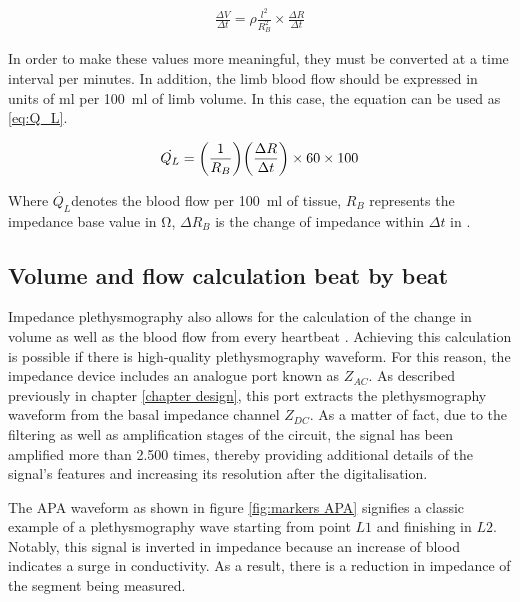 \begin{align}
	\label{eq:DVDT}
	\frac{\Delta V}{\Delta t}= \rho \frac{l^2}{R_B^2} \times \frac{\Delta R}{\Delta t}
\end{align} 

In order to make these values more meaningful, they must be converted at a time interval per minutes. In addition, the limb blood flow should be expressed in units of \si{\milli\litre} per \SI{100}{\milli\litre} of limb volume. In this case, the equation can be used as \ref{eq:Q_L}.

\begin{align}
	\label{eq:Q_L}
	\dot{Q_L} = \bigg( \frac{1}{R_B} \bigg) \bigg( \frac{\Delta R}{\Delta t} \bigg) \times 60  \times 100  \tagaddtext{[\si{ml/min.100.ml}]}
\end{align} 

Where $\dot{Q_L}$denotes the blood flow per \SI{100}{\milli\litre} of tissue, $R_B$ represents the impedance base value in \si{\ohm}, $\Delta R_B$ is the change of impedance within ${\Delta t}$ in \si{\sec}.

\subsection{Volume and flow calculation beat by beat}
\label{section procedure flow beat}
Impedance plethysmography also allows for the calculation of the change in volume as well as the blood flow from every heartbeat \cite{costeloe1980continuous, anderson1984impedance, mohapatra1981non, golden1986assessment}. Achieving this calculation is possible if there is high-quality plethysmography waveform. For this reason, the impedance device includes an analogue port known as $Z_{AC}$. As described previously in chapter \ref{chapter design}, this port extracts the plethysmography waveform from the basal impedance channel $Z_{DC}$. As a matter of fact, due to the filtering  as well as amplification stages of the circuit, the signal has been amplified more than \num{2.500} times, thereby providing additional details of the signal's features and increasing its resolution after the digitalisation.

The APA waveform as shown in figure \ref{fig:markers APA} signifies a classic example of a plethysmography wave starting from point $L1$ and finishing in $L2$. Notably, this signal is inverted in impedance because an increase of blood indicates a surge in conductivity. As a result, there is a reduction in impedance of the segment being measured. 

